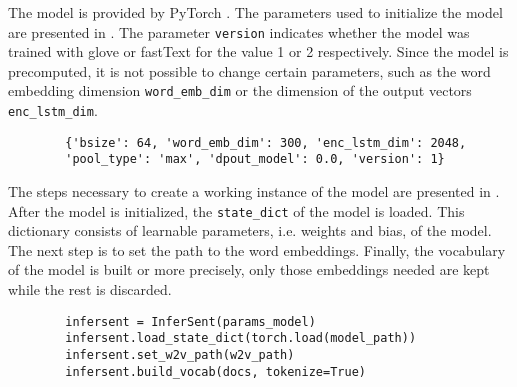 \subsubsection*{\infersent{}}\label{subsubsec:impl-infersent}

The \infersent{} model is provided by PyTorch \cite{HfsentTrans2019}.
The parameters used to initialize the model are presented in .
The parameter \texttt{version} indicates whether the model was trained with \acs{glove} or fastText for the value 1 or 2 respectively.
Since the model is precomputed, it is not possible to change certain parameters, 
such as the word embedding dimension \texttt{word\_emb\_dim} or the dimension of the output vectors \texttt{enc\_lstm\_dim}.

\begin{listing}[htp]
    \begin{verbatim}
        {'bsize': 64, 'word_emb_dim': 300, 'enc_lstm_dim': 2048,  
        'pool_type': 'max', 'dpout_model': 0.0, 'version': 1}
    \end{verbatim}
    \caption{Parameters of the \infersent{} model.
    }
    \label{lst:infersent-params}
\end{listing}

The steps necessary to create a working instance of the \infersent{} model are presented in .
After the \infersent{} model is initialized, the \texttt{state\_dict} of the model is loaded.
This dictionary consists of learnable parameters, i.e. weights and bias, of the model.
The next step is to set the path to the word embeddings.
Finally, the vocabulary of the model is built or more precisely, only those embeddings needed are kept while the rest is discarded.

\begin{listing}[htp]
    \begin{verbatim}
        infersent = InferSent(params_model)
        infersent.load_state_dict(torch.load(model_path))
        infersent.set_w2v_path(w2v_path)
        infersent.build_vocab(docs, tokenize=True)
    \end{verbatim}
    \caption{Initializing the \infersent{} model.
    }
    \label{lst:infersent-init}
\end{listing}

